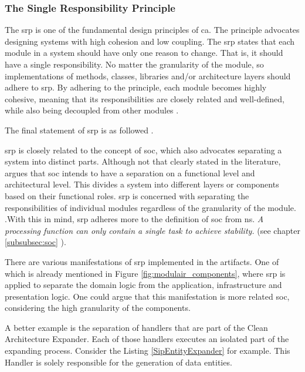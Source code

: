 \subsubsection{The Single Responsibility Principle} \label{subsubsec:srp}

The \gls{srp} is one of the fundamental design principles of \gls{ca}. The principle
advocates designing systems with high cohesion and low coupling. The \gls{srp} states that
each module in a system should have only one reason to change. That is, it should have a
single responsibility. No matter the granularity of the module, so implementations of
methods, classes, libraries and/or architecture layers should adhere to \gls{srp}. By
adhering to the principle, each module becomes highly cohesive, meaning that its
responsibilities are closely related and well-defined, while also being decoupled from
other modules \parencite[81]{robert_c_martin_clean_2018}.

The final statement of \gls{srp} is as followed
\parencite[82]{robert_c_martin_clean_2018}.


\gls{srp} is closely related to the concept of \gls{soc}, which also advocates separating
a system into distinct parts. Although not that clearly stated in the literature,
\citeauthor{robert_c_martin_clean_2018} argues that \gls{soc} intends to have a separation
on a functional level and architectural level. This divides a system into different layers
or components based on their functional roles. \gls{srp} is concerned with separating the
responsibilities of individual modules regardless of the granularity of the module.
\parencite[205]{robert_c_martin_clean_2018}.With this in mind, \gls{srp} adheres more to
the definition of \gls{soc} from \gls{ns}. \textit{A processing function can only contain
a single task to achieve stability.} (see chapter \ref{subsubsec:soc}
).

There are various manifestations of \gls{srp} implemented in the artifacts. One of which is
already mentioned in Figure \ref{fig:modulair_components}, where \gls{srp} is applied to
separate the domain logic from the application, infrastructure and presentation logic. One
could argue that this manifestation is more related \gls{soc}, considering the high
granularity of the components.

A better example is the separation of handlers that are part of the Clean Architecture
Expander. Each of those handlers executes an isolated part of the expanding process.
Consider the Listing \ref{SipEntityExpander} 
\parencite{koks_expandentitieshandlerinteractor_2023} for example. This Handler is solely
responsible for the generation of data entities. 


